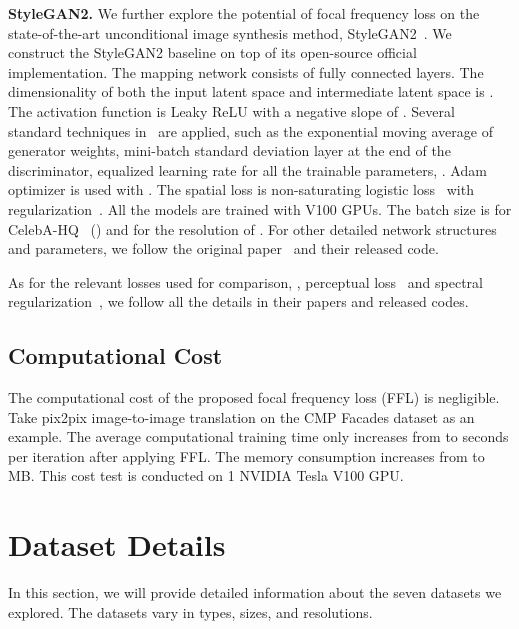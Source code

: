 \documentclass[10pt,twocolumn,letterpaper]{article}
\begin{document}
\vspace{0.1cm}
\noindent
\textbf{StyleGAN2.}
We further explore the potential of focal frequency loss on the state-of-the-art unconditional image synthesis method, StyleGAN2~\cite{stylegan2}.
We construct the StyleGAN2 baseline on top of its open-source official implementation.
The mapping network consists of  fully connected layers. The dimensionality of both the input latent space and intermediate latent space is .
The activation function is Leaky ReLU with a negative slope of .
Several standard techniques in~\cite{pggan,stylegan} are applied, such as the exponential moving average of generator weights, mini-batch standard deviation layer at the end of the discriminator, equalized learning rate for all the trainable parameters, \etc.
Adam~\cite{adam} optimizer is used with .
The spatial loss is non-saturating logistic loss~\cite{GAN,stylegan2} with  regularization~\cite{ganstability}.
All the models are trained with  V100 GPUs. The batch size is  for CelebA-HQ~\cite{pggan} () and  for the resolution of .
For other detailed network structures and parameters, we follow the original paper~\cite{stylegan2} and their released code.


\vspace{0.1cm}
As for the relevant losses used for comparison, \ie, perceptual loss~\cite{perceptualloss} and spectral regularization~\cite{specreg}, we follow all the details in their papers and released codes.


\subsection{Computational Cost}
\label{sec:computationalcost}
The computational cost of the proposed focal frequency loss (FFL) is negligible. 
Take pix2pix image-to-image translation on the CMP Facades dataset as an example. The average computational training time only increases from  to  seconds per iteration after applying FFL.
The memory consumption increases from  to  MB.
This cost test is conducted on 1 NVIDIA Tesla V100 GPU.



\section{Dataset Details}
\label{sec:dataset}
In this section, we will provide detailed information about the seven datasets we explored. The datasets vary in types, sizes, and resolutions.
\end{document}
